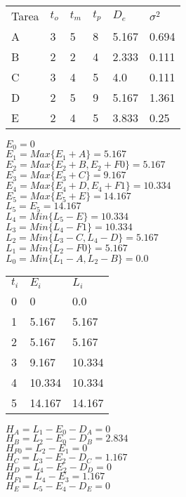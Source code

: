 \raggedright
\begin{table}[h]
\begin{tabular}{llllll}
Tarea & $t_o$ & $t_m$ & $t_p$ & $D_e$ & $\sigma^{2}$ \\
A & 3 & 5 & 8 & 5.167 & 0.694 \\
B & 2 & 2 & 4 & 2.333 & 0.111 \\
C & 3 & 4 & 5 & 4.0 & 0.111 \\
D & 2 & 5 & 9 & 5.167 & 1.361 \\
E & 2 & 4 & 5 & 3.833 & 0.25 \\
\end{tabular}
\end{table}




$E_0 = 0$\\
$E_1 = Max \{E_1 + A\} = 5.167$\\
$E_2 = Max \{E_2 + B, E_2 + F0\} = 5.167$\\
$E_3 = Max \{E_3 + C\} = 9.167$\\
$E_4 = Max \{E_4 + D, E_4 + F1\} = 10.334$\\
$E_5 = Max \{E_5 + E\} = 14.167$\\
$L_5 = E_5 = 14.167$\\
$L_4 = Min \{L_5 - E\} = 10.334$\\
$L_3 = Min \{L_4 - F1\} = 10.334$\\
$L_2 = Min \{L_3 - C, L_4 - D\} = 5.167$\\
$L_1 = Min \{L_2 - F0\} = 5.167$\\
$L_0 = Min \{L_1 - A, L_2 - B\} = 0.0$\\




\begin{table}[h]
\begin{tabular}{lll}
$t_i$ & $E_i$ & $L_i$ \\
0 & 0 & 0.0 \\
1 & 5.167 & 5.167 \\
2 & 5.167 & 5.167 \\
3 & 9.167 & 10.334 \\
4 & 10.334 & 10.334 \\
5 & 14.167 & 14.167 \\
\end{tabular}
\end{table}




$H_A = L_1 - E_0 - D_A = 0$\\
$H_B = L_2 - E_0 - D_B = 2.834$\\
$H_{F0} = L_2 - E_1 = 0$\\
$H_C = L_3 - E_2 - D_C = 1.167$\\
$H_D = L_4 - E_2 - D_D = 0$\\
$H_{F1} = L_4 - E_3 = 1.167$\\
$H_E = L_5 - E_4 - D_E = 0$\\




